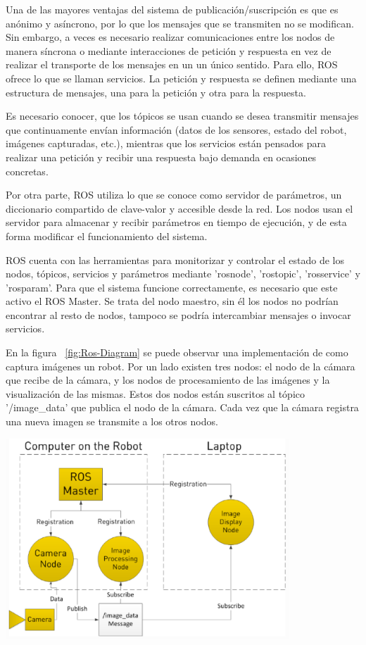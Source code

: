 Una de las mayores ventajas del sistema de publicación/suscripción es que es
anónimo y asíncrono, por lo que los mensajes que se transmiten no se modifican.
Sin embargo, a veces es necesario realizar comunicaciones entre los nodos de
manera síncrona o mediante interacciones de petición y respuesta en vez de
realizar el transporte de los mensajes en un un único sentido. Para ello, ROS
ofrece lo que se llaman servicios. La petición y respuesta se definen mediante
una estructura de mensajes, una para la petición y otra para la respuesta.

Es necesario conocer, que los tópicos se usan cuando se desea transmitir
mensajes que continuamente envían información (datos de los sensores, estado del
robot, imágenes capturadas, etc.), mientras que los servicios están pensados
para realizar una petición y recibir una respuesta bajo demanda en ocasiones
concretas.

Por otra parte, ROS utiliza lo que se conoce como servidor de parámetros, un
diccionario compartido de clave-valor y accesible desde la red. Los nodos usan
el servidor para almacenar y recibir parámetros en tiempo de ejecución, y de
esta forma modificar el funcionamiento del sistema.

ROS cuenta con las herramientas para monitorizar y controlar el estado de los
nodos, tópicos, servicios y parámetros mediante 'rosnode', 'rostopic',
'rosservice' y 'rosparam'. Para que el sistema funcione correctamente, es
necesario que este activo el ROS Master. Se trata del nodo maestro, sin él los
nodos no podrían encontrar al resto de nodos, tampoco se podría intercambiar
mensajes o invocar servicios.

En la figura ~\ref{fig:Ros-Diagram} se puede observar una implementación de como
captura imágenes un robot. Por un lado existen tres nodos: el nodo de la cámara
que recibe de la cámara, y los nodos de procesamiento de las imágenes y la
visualización de las mismas. Estos dos nodos están suscritos al tópico
'/image\_data' que publica el nodo de la cámara. Cada vez que la cámara registra
una nueva imagen se transmite a los otros nodos.

\begin{minipage}{\linewidth}
    \centering
    \includegraphics[width=0.8\textwidth]{images/cap3/RosDiagrama.eps}
    \label{fig:Ros-Diagram}
\end{minipage}

